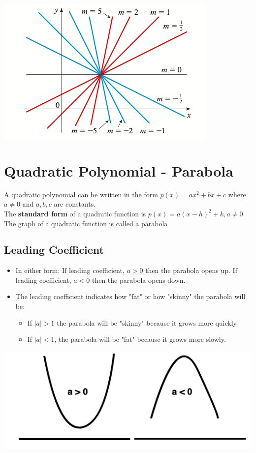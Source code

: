 \documentclass{book}
\begin{document}
	\includegraphics[scale=0.7]{slope2}
	
	\section{Quadratic Polynomial - Parabola}

	A quadratic polynomial can be written in the form $p(x) = ax^2 + bx + c$ where $a \neq 0 $ and $a,b,c$ are constants. \\
	The \textbf{standard form} of a quadratic function is $p(x) =a(x-h)^2 + k, a \neq 0$ \\
	The graph of a quadratic function is called a parabola
	\subsection{Leading Coefficient}
	\begin{itemize}
		\item In either form: If leading coefficient, $a>0$ then the parabola opens up. If leading coefficient, $a<0$ then the parabola opens down.
		\item The leading coefficient indicates how "fat" or how "skinny" the parabola will be:
		\begin{itemize}
			\item If  $\mid a \mid > 1$ the parabola will be "skinny" because it grows more quickly
			\item If $\mid a \mid < 1$,  the parabola will be "fat" because it grows more slowly.
		\end{itemize}
	\end{itemize}
	
	\includegraphics[scale=0.6]{parabolalc}
	
\end{document}
